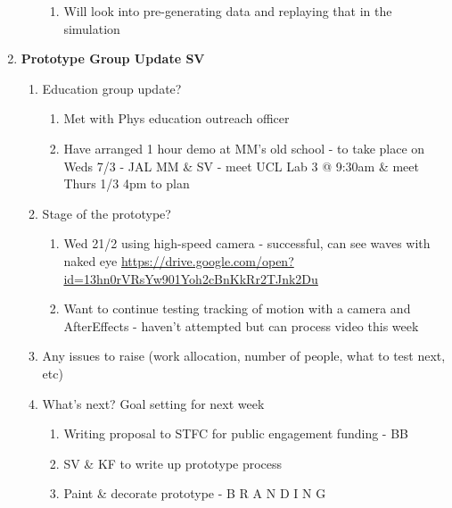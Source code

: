 \begin{enumerate}
\begin{enumerate}
\begin{enumerate}
\item  Will look into pre-generating data and replaying that in the simulation
\end{enumerate}
\vspace{5mm}

\end{enumerate}

\item  \textbf{Prototype Group Update SV}

\begin{enumerate}
\item Education group update?

\begin{enumerate}
\item  Met with Phys education outreach officer

\item  Have arranged 1 hour demo at MM's old school - to take place on Weds 7/3 - JAL MM \& SV - meet UCL Lab 3 @ 9:30am \& meet Thurs 1/3 4pm to plan
\end{enumerate}

\item  Stage of the prototype?

\begin{enumerate}
\item  Wed 21/2 using high-speed camera - successful, can see waves with naked eye \url{https://drive.google.com/open?id=13hn0rVRsYw901Yoh2cBnKkRr2TJnk2Du}

\item  Want to continue testing tracking of motion with a camera and AfterEffects - haven't attempted but can process video this week
\end{enumerate}

\item  Any issues to raise (work allocation, number of people, what to test next, etc)

\item  What's next? Goal setting for next week

\begin{enumerate}
\item  Writing proposal to STFC for public engagement funding - BB

\item  SV \& KF to write up prototype process

\item  Paint \& decorate prototype - B R A N D I N G
\end{enumerate}
\vspace{5mm}


\end{enumerate}
\end{enumerate}
